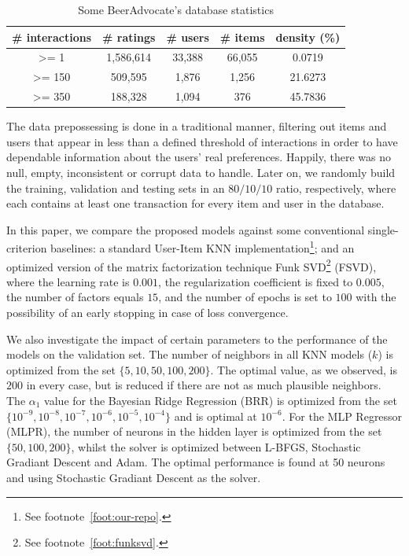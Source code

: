 \documentclass[sigconf,authordraft]{acmart}
\begin{document}
\begin{table}[h]
\caption{Some BeerAdvocate's database statistics}
\begin{tabular}{@{}c||ccc|c@{}}
\toprule
\# interactions & \# ratings & \# users & \# items & density (\%) \\ \midrule
>= 1            & 1,586,614  & 33,388   & 66,055   & 0.0719       \\
>= 150          & 509,595    & 1,876    & 1,256    & 21.6273      \\
>= 350          & 188,328    & 1,094    & 376      & 45.7836      \\ \bottomrule
\end{tabular}
\label{tab:stats}
\end{table}

The data prepossessing is done in a traditional manner, filtering out items and users that appear in less than a defined threshold of interactions in order to have dependable information about the users' real preferences. Happily, there was no null, empty, inconsistent or corrupt data to handle. Later on, we randomly build the training, validation and testing sets in an $80 / 10 / 10$ ratio, respectively, where each contains at least one transaction for every item and user in the database.

In this paper, we compare the proposed models against some conventional single-criterion baselines: a standard User-Item KNN implementation\footnote{See footnote~\ref{foot:our-repo}.}; and an optimized version of the matrix factorization technique Funk SVD\footnote{See footnote~\ref{foot:funksvd}.} (FSVD), where the learning rate is $0.001$, the regularization coefficient is fixed to $0.005$, the number of factors equals $15$, and the number of epochs is set to $100$ with the possibility of an early stopping in case of loss convergence.

We also investigate the impact of certain parameters to the performance of the models on the validation set. The number of neighbors in all KNN models ($k$) is optimized from the set $\{5, 10, 50, 100, 200\}$. The optimal value, as we observed, is $200$ in every case, but is reduced if there are not as much plausible neighbors. The $\alpha_1$ value for the Bayesian Ridge Regression (BRR) is optimized from the set $\{10^{-9}, 10^{-8}, 10^{-7}, 10^{-6}, 10^{-5}, 10^{-4}\}$ and is optimal at $10^{-6}$. For the MLP Regressor (MLPR), the number of neurons in the hidden layer is optimized from the set $\{50, 100, 200\}$, whilst the solver is optimized between L-BFGS, Stochastic Gradiant Descent and Adam. The optimal performance is found at 50 neurons and using Stochastic Gradiant Descent as the solver.
\end{document}
